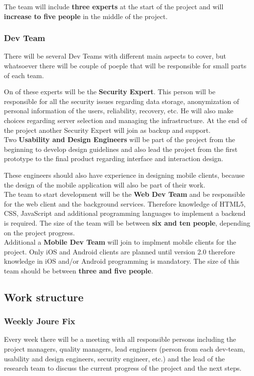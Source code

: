 \documentclass[a4paper,11pt]{article}
\begin{document}
The team will include \textbf{three experts} at the start of the project and will \textbf{increase to five people} in the middle of the project. 

\subsubsection{Dev Team}
There will be several Dev Teams with different main aspects to cover, but whatsoever there will be couple of poeple that will be responsible for small parts of each team.

On of these experts will be the \textbf{Security Expert}. This person will be responsible for all the security issues regarding data storage, anonymization of personal information of the users, reliability, recovery, etc. He will also make choices regarding server selection and managing the infrastructure. At the end of the project another Security Expert will join as backup and support. \\

Two \textbf{Usability and Design Engineers} will be part of the project from the beginning to develop design guidelines and also lead the project from the first prototype to the final product regarding interface and interaction design.

These engineers should also have experience in designing mobile clients, because the design of the mobile application will also be part of their work. \\

The team to start development will be the \textbf{Web Dev Team} and be responsible for the web client and the background services. Therefore knowledge of HTML5, CSS, JavaScript and additional programming languages to implement a backend is required. The size of the team will be between \textbf{six and ten people}, depending on the project progress. \\

Additional a \textbf{Mobile Dev Team} will join to implment mobile clients for the project. Only iOS and Android clients are planned until version 2.0 therefore knowledge in iOS and/or Android programming is mandatory. The size of this team should be between \textbf{three and five people}.

\subsection{Work structure}

\subsubsection{Weekly Joure Fix}
Every week there will be a meeting with all responsible persons including the project managers, quality managers, lead engineers (person from each dev-team, usability and design engineers, security engineer, etc.) and the lead of the research team to discuss the current progress of the project and the next steps.
\end{document}
